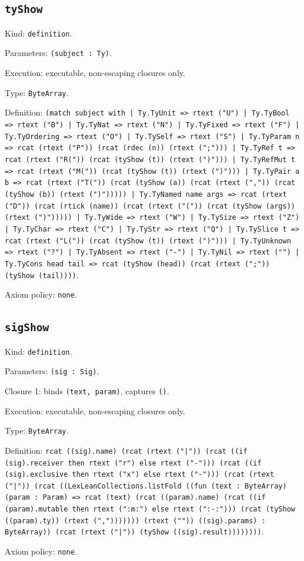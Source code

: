 \documentclass[11pt]{article}
\begin{document}
\subsection*{\texttt{tyShow}}
\noindent Kind: \texttt{definition}.\par
\noindent Parameters: \texttt{(subject : Ty)}.\par
\noindent Execution: executable, non-escaping closures only.\par
\noindent Type: \texttt{ByteArray}.\par
\noindent Definition: \texttt{(match subject with | Ty.TyUnit => rtext ("U") | Ty.TyBool => rtext ("B") | Ty.TyNat => rtext ("N") | Ty.TyFixed => rtext ("F") | Ty.TyOrdering => rtext ("O") | Ty.TySelf => rtext ("S") | Ty.TyParam n => rcat (rtext ("P")) (rcat (rdec (n)) (rtext (";"))) | Ty.TyRef t => rcat (rtext ("R(")) (rcat (tyShow (t)) (rtext (")"))) | Ty.TyRefMut t => rcat (rtext ("M(")) (rcat (tyShow (t)) (rtext (")"))) | Ty.TyPair a b => rcat (rtext ("T(")) (rcat (tyShow (a)) (rcat (rtext (",")) (rcat (tyShow (b)) (rtext (")"))))) | Ty.TyNamed name args => rcat (rtext ("D")) (rcat (rtick (name)) (rcat (rtext ("(")) (rcat (tyShow (args)) (rtext (")"))))) | Ty.TyWide => rtext ("W") | Ty.TySize => rtext ("Z") | Ty.TyChar => rtext ("C") | Ty.TyStr => rtext ("Q") | Ty.TySlice t => rcat (rtext ("L(")) (rcat (tyShow (t)) (rtext (")"))) | Ty.TyUnknown => rtext ("?") | Ty.TyAbsent => rtext ("-") | Ty.TyNil => rtext ("") | Ty.TyCons head tail => rcat (tyShow (head)) (rcat (rtext (";")) (tyShow (tail))))}.\par
\noindent Axiom policy: \texttt{none}.\par
\subsection*{\texttt{sigShow}}
\noindent Kind: \texttt{definition}.\par
\noindent Parameters: \texttt{(sig : Sig)}.\par
\noindent Closure 1: binds \texttt{(text, param)}, captures \texttt{()}.\par
\noindent Execution: executable, non-escaping closures only.\par
\noindent Type: \texttt{ByteArray}.\par
\noindent Definition: \texttt{rcat ((sig).name) (rcat (rtext ("|")) (rcat ((if (sig).receiver then rtext ("r") else rtext ("-"))) (rcat ((if (sig).exclusive then rtext ("x") else rtext ("-"))) (rcat (rtext ("|")) (rcat ((LexLeanCollections.listFold ((fun (text : ByteArray) (param : Param) => rcat (text) (rcat ((param).name) (rcat ((if (param).mutable then rtext (":m:") else rtext (":-:"))) (rcat (tyShow ((param).ty)) (rtext (","))))))) (rtext ("")) ((sig).params) : ByteArray)) (rcat (rtext ("|")) (tyShow ((sig).result))))))))}.\par
\noindent Axiom policy: \texttt{none}.\par
\end{document}

